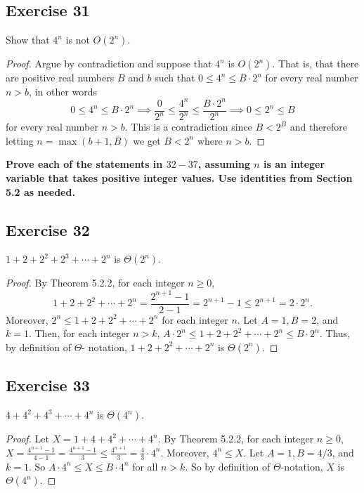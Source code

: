 \documentclass[14pt]{extarticle}
\newcommand{\dps}{\displaystyle}
\newcommand{\cy}{\color{cyan}}
\begin{document}
\subsection{Exercise 31}
Show that \(4^n\) is not \(O(2^n)\).

\begin{proof}
Argue by contradiction and suppose that \(4^n\) is \(O(2^n)\). That is, that there are positive real numbers \(B\) and \(b\) 
such that \(0 \leq 4^n \leq B \cdot 2^n\) for every real number \(n > b\), in other words
\[
0 \leq 4^n \leq B \cdot 2^n \implies \frac{0}{2^n} \leq \frac{4^n}{2^n} \leq \frac{B \cdot 2^n}{2^n} \implies 0 \leq
2^n \leq B
\]
for every real number \(n > b\). This is a contradiction since \(B < 2^B\) and therefore letting \(n = \max(b+1, B)\) we get
\(B < 2^n\) where \(n > b\).
\end{proof}

{\bf \cy Prove each of the statements in \(32-37\), assuming \(n\) is an integer variable that takes positive integer 
values. Use identities from Section 5.2 as needed.}

\subsection{Exercise 32}
\(1 + 2 + 2^2 + 2^3 + \cdots + 2^n\) is \(\Theta(2^n)\).
\begin{proof}
By Theorem 5.2.2, for each integer \(n \geq 0\),
\[
1+2+2^2 + \cdots + 2^n = \frac{2^{n+1} - 1}{2-1} = 2^{n+1} - 1 \leq 2^{n+1} = 2 \cdot 2^n.
\]
Moreover, \(2^n \leq 1+2+2^2 + \cdots + 2^n\) for each integer \(n\). Let \(A = 1, B = 2\), and \(k = 1\). Then, for each 
integer \(n > k\), \(A \cdot 2^n \leq 1 + 2 + 2^2 + \cdots + 2^n \leq B \cdot 2^n\). Thus, by definition of \(\Theta\)-
notation, \(1 + 2 + 2^2 + \cdots + 2^n\) is \(\Theta(2^n)\).
\end{proof}

\subsection{Exercise 33}
\(4 + 4^2 + 4^3 + \cdots + 4^n\) is \(\Theta(4^n)\).
\begin{proof}
Let \(X = 1 + 4 + 4^2 + \cdots + 4^n\). By Theorem 5.2.2, for each integer \(n \geq 0\), \(\dps X = \frac{4^{n+1} - 1}{4-1} 
= \frac{4^{n+1} - 1}{3} \leq \frac{4^{n+1}}{3} = \frac{4}{3}\cdot 4^n\). Moreover, \(4^n \leq X\). Let \(A = 1, B = 4/3\), 
and \(k = 1\). So \(A \cdot 4^n \leq X \leq B \cdot 4^n\) for all \(n > k\). So by definition of \(\Theta\)-notation, \(X\) 
is \(\Theta(4^n)\).
\end{proof}
\end{document}
